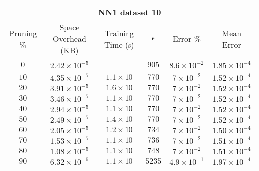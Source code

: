 \begin{adjustwidth}{0cm}{}
\begin{tabular}{cccccc}
\hline
\multicolumn{6}{c}{NN1 dataset 10} \\
\toprule
Pruning \% & Space Overhead (KB) & Training Time (s) & $\epsilon$ & Error \% & Mean Error\\
\midrule
$0$ & $2.42 \times 10^{-5}$ & - & $905$ & $8.6 \times 10^{-2}$ & $1.85 \times 10^{-4}$\\
$10$ & $4.35 \times 10^{-5}$ & $1.1 \times 10$ & $770$ & $7 \times 10^{-2}$ & $1.52 \times 10^{-4}$\\
$20$ & $3.91 \times 10^{-5}$ & $1.6 \times 10$ & $770$ & $7 \times 10^{-2}$ & $1.52 \times 10^{-4}$\\
$30$ & $3.46 \times 10^{-5}$ & $1.1 \times 10$ & $770$ & $7 \times 10^{-2}$ & $1.52 \times 10^{-4}$\\
$40$ & $2.94 \times 10^{-5}$ & $1.1 \times 10$ & $770$ & $7 \times 10^{-2}$ & $1.52 \times 10^{-4}$\\
$50$ & $2.49 \times 10^{-5}$ & $1.4 \times 10$ & $770$ & $7 \times 10^{-2}$ & $1.52 \times 10^{-4}$\\
$60$ & $2.05 \times 10^{-5}$ & $1.2 \times 10$ & $734$ & $7 \times 10^{-2}$ & $1.50 \times 10^{-4}$\\
$70$ & $1.53 \times 10^{-5}$ & $1.1 \times 10$ & $736$ & $7 \times 10^{-2}$ & $1.51 \times 10^{-4}$\\
$80$ & $1.08 \times 10^{-5}$ & $1.1 \times 10$ & $748$ & $7 \times 10^{-2}$ & $1.51 \times 10^{-4}$\\
$90$ & $6.32 \times 10^{-6}$ & $1.1 \times 10$ & $5235$ & $4.9 \times 10^{-1}$ & $1.97 \times 10^{-4}$\\
\bottomrule
\end{tabular}
\end{adjustwidth}

\newpage


